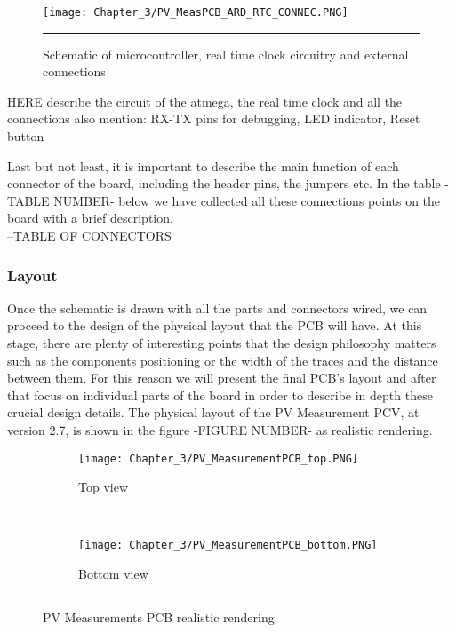 \begin{figure}[htbp]
	\centering
		\texttt{[image: Chapter\_3/PV\_MeasPCB\_ARD\_RTC\_CONNEC.PNG]}
		\rule{35em}{0.5pt}
	\caption{Schematic of microcontroller, real time clock circuitry and external connections}
	\label{fig:PV_MeasPCB_ARD_RTC_CONNEC}
\end{figure}
 
 HERE describe the circuit of the atmega, the real time clock and all the connections
 also mention: RX-TX pins for debugging, LED indicator, Reset button
 
 Last but not least, it is important to describe the main function of each connector of the board, including the header pins, the jumpers etc. In the table -TABLE NUMBER- below we have collected all these connections points on the board with a brief description.\\
 
 --TABLE OF CONNECTORS\\
 
\subsubsection{Layout}
Once the schematic is drawn with all the parts and connectors wired, we can proceed to the design of the physical layout that the PCB will have. At this stage, there are plenty of interesting points that the design philosophy matters such as the components positioning or the width of the traces and the distance between them. For this reason we will present the final PCB's layout and after that focus on individual parts of the board in order to describe in depth these crucial design details. The physical layout of the PV Measurement PCV, at version 2.7, is shown in the figure -FIGURE NUMBER- as realistic rendering.\\


\begin{figure}[htbp]
	\centering
	\begin{subfigure}[b]{.45\textwidth}
		\texttt{[image: Chapter\_3/PV\_MeasurementPCB\_top.PNG]}
	    \caption[]{Top view}
	    \label{fig:PV_MeasurementPCB_top}
	\end{subfigure}
    ~
	\begin{subfigure}[b]{.45\textwidth}
		\texttt{[image: Chapter\_3/PV\_MeasurementPCB\_bottom.PNG]}
	    \caption[]{Bottom view}
	    \label{fig:PV_MeasurementPCB_bottom}
	\end{subfigure}
	\rule{35em}{0.5pt}
	\caption{PV Measurements PCB realistic rendering}
	\label{fig:PV_MeasurementPCB_render}
\end{figure}

